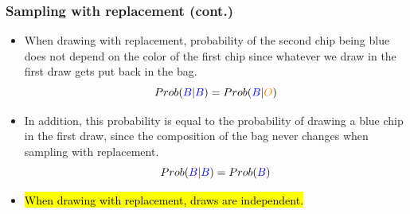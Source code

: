 \documentclass[notes,11pt, aspectratio=169]{beamer}
\begin{document}
\begin{frame}
\frametitle{Sampling with replacement (cont.)}

\begin{itemize}

\item When drawing with replacement, probability of the second chip being blue does not depend on the color of the first chip since whatever we draw in the first draw gets put back in the bag.
\[ Prob(\textcolor{blue}{B} | \textcolor{blue}{B}) = Prob(\textcolor{blue}{B} | \textcolor{orange}{O}) \]

\item In addition, this probability is equal to the probability of drawing a blue chip in the first draw, since the composition of the bag never changes when sampling with replacement.
\[ Prob(\textcolor{blue}{B} | \textcolor{blue}{B}) = Prob(\textcolor{blue}{B}) \]

\item \hl{When drawing with replacement, draws are independent.}

\end{itemize}

\end{frame}


\end{document}
